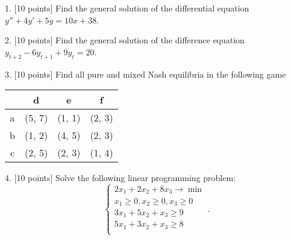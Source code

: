 \documentclass[12pt,a4paper]{article}
\begin{document}
\newpage
{}


 1.  {[10 points]} Find the general solution of the differential equation $y'' + 4y' + 5y = 10x+38$.

 
 \newpage
{}

  2.  {[10 points]}  Find the general solution of the difference equation $y_{t+2} - 6y_{t+1} + 9y_t = 20$.

\newpage
{}

  3. {[10 points]} Find all pure and mixed Nash equilibria in the following game

\begin{center}
\begin{tabular}{@{}cccc@{}}
\toprule
  & d & e & f \\ \midrule
a & (5, 7) & (1, 1)  & (2, 3)   \\
b & (1, 2) & (4, 5) & (2, 3)   \\
c & (2, 5) & (2, 3) & (1, 4)   \\ \bottomrule
\end{tabular}
\end{center}

\newpage
{}

4. {[10 points]} Solve the following linear programming problem:
\[
\begin{cases}
2x_1 + 2x_2 + 8x_3 \to \min \\
x_1 \geq 0, x_2 \geq 0, x_3 \geq 0 \\
3x_1 + 5x_2 + x_3 \geq 9 \\
5x_1 + 3x_2 + x_3 \geq 8 \\
\end{cases}.
\]
\end{document}
